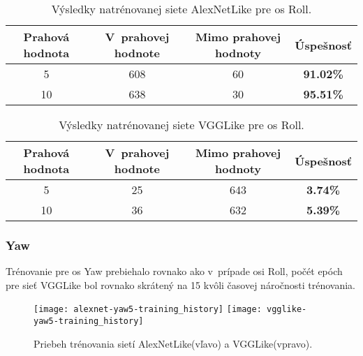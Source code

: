 \begin{table}[H]
    \centering
    \begin{tabular}{|c|c|c|c|}
        \hline
        Prahová hodnota & V~prahovej hodnote       & Mimo prahovej hodnoty    & Úspešnosť    \\ \hline
        5               & {\color[HTML]{009901} 608} & {\color[HTML]{9A0000} 60} & \textbf{91.02\%} \\ \hline
        10              & {\color[HTML]{009901} 638} & {\color[HTML]{9A0000} 30} & \textbf{95.51\%} \\ \hline
    \end{tabular}
    \caption{Výsledky natrénovanej siete AlexNetLike pre os Roll.}
    \label{tab:alexnetrollresults}
\end{table}
\begin{table}[H]
    \centering
    \begin{tabular}{|c|c|c|c|}
        \hline
        Prahová hodnota & V~prahovej hodnote       & Mimo prahovej hodnoty    & Úspešnosť    \\ \hline
        5               & {\color[HTML]{009901} 25} & {\color[HTML]{9A0000} 643} & \textbf{3.74\%} \\ \hline
        10              & {\color[HTML]{009901} 36} & {\color[HTML]{9A0000} 632} & \textbf{5.39\%} \\ \hline
    \end{tabular}
    \caption{Výsledky natrénovanej siete VGGLike pre os Roll.}
    \label{tab:vgglikerollresults}
\end{table}


\subsubsection{Yaw}
Trénovanie pre os Yaw prebiehalo rovnako ako v~prípade osi Roll, počét epóch pre sieť VGGLike
    bol rovnako skrátený na 15 kvôli časovej náročnosti trénovania.

\begin{figure}[H]
    \centering
    \texttt{[image: alexnet-yaw5-training\_history]}
	\texttt{[image: vgglike-yaw5-training\_history]}
	\caption{Priebeh trénovania sietí AlexNetLike(vľavo) a VGGLike(vpravo).}
	\label{pic:yawaxis}
\end{figure}

